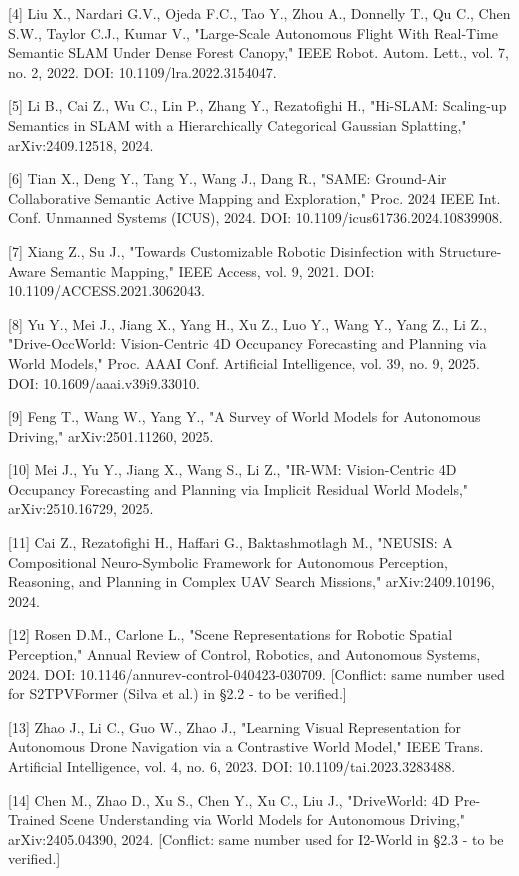 \documentclass[
]{article}
\begin{document}
{[}4{]} Liu X., Nardari G.V., Ojeda F.C., Tao Y., Zhou A., Donnelly T.,
Qu C., Chen S.W., Taylor C.J., Kumar V., "Large-Scale Autonomous Flight
With Real-Time Semantic SLAM Under Dense Forest Canopy," IEEE Robot.
Autom. Lett., vol. 7, no. 2, 2022. DOI: 10.1109/lra.2022.3154047.

{[}5{]} Li B., Cai Z., Wu C., Lin P., Zhang Y., Rezatofighi H.,
"Hi-SLAM: Scaling-up Semantics in SLAM with a Hierarchically Categorical
Gaussian Splatting," arXiv:2409.12518, 2024.

{[}6{]} Tian X., Deng Y., Tang Y., Wang J., Dang R., "SAME: Ground-Air
Collaborative Semantic Active Mapping and Exploration," Proc. 2024 IEEE
Int. Conf. Unmanned Systems (ICUS), 2024. DOI:
10.1109/icus61736.2024.10839908.

{[}7{]} Xiang Z., Su J., "Towards Customizable Robotic Disinfection with
Structure-Aware Semantic Mapping," IEEE Access, vol. 9, 2021. DOI:
10.1109/ACCESS.2021.3062043.

{[}8{]} Yu Y., Mei J., Jiang X., Yang H., Xu Z., Luo Y., Wang Y., Yang
Z., Li Z., "Drive-OccWorld: Vision-Centric 4D Occupancy Forecasting and
Planning via World Models," Proc. AAAI Conf. Artificial Intelligence,
vol. 39, no. 9, 2025. DOI: 10.1609/aaai.v39i9.33010.

{[}9{]} Feng T., Wang W., Yang Y., "A Survey of World Models for
Autonomous Driving," arXiv:2501.11260, 2025.

{[}10{]} Mei J., Yu Y., Jiang X., Wang S., Li Z., "IR-WM: Vision-Centric
4D Occupancy Forecasting and Planning via Implicit Residual World
Models," arXiv:2510.16729, 2025.

{[}11{]} Cai Z., Rezatofighi H., Haffari G., Baktashmotlagh M., "NEUSIS:
A Compositional Neuro-Symbolic Framework for Autonomous Perception,
Reasoning, and Planning in Complex UAV Search Missions,"
arXiv:2409.10196, 2024.

{[}12{]} Rosen D.M., Carlone L., "Scene Representations for Robotic
Spatial Perception," Annual Review of Control, Robotics, and Autonomous
Systems, 2024. DOI: 10.1146/annurev-control-040423-030709. {[}Conflict:
same number used for S2TPVFormer (Silva et al.) in §2.2 - to be
verified.{]}

{[}13{]} Zhao J., Li C., Guo W., Zhao J., "Learning Visual
Representation for Autonomous Drone Navigation via a Contrastive World
Model," IEEE Trans. Artificial Intelligence, vol. 4, no. 6, 2023. DOI:
10.1109/tai.2023.3283488.

{[}14{]} Chen M., Zhao D., Xu S., Chen Y., Xu C., Liu J., "DriveWorld:
4D Pre-Trained Scene Understanding via World Models for Autonomous
Driving," arXiv:2405.04390, 2024. {[}Conflict: same number used for
I2-World in §2.3 - to be verified.{]}
\end{document}
